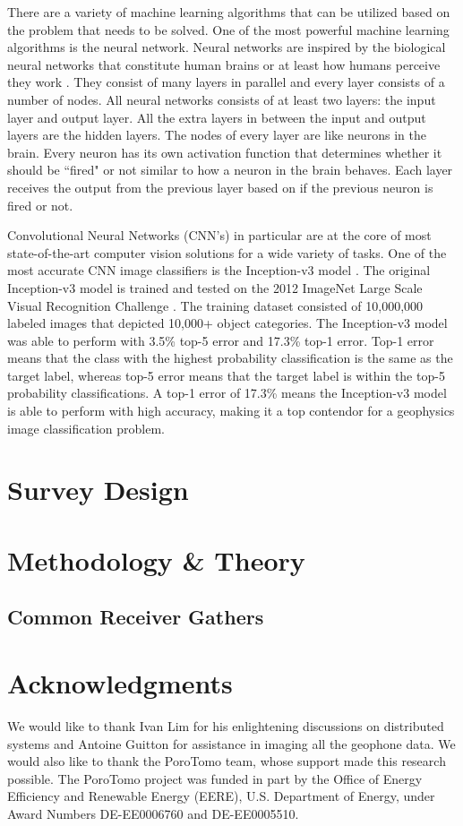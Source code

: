 There are a variety of machine learning algorithms that can be utilized based on the problem that needs to be solved. One of the most powerful machine learning algorithms is the neural network. Neural networks are inspired by the biological neural networks that constitute human brains or at least how humans perceive they work \citep{Gerven2018}. They consist of many layers in parallel and every layer consists of a number of nodes. All neural networks consists of at least two layers: the input layer and output layer. All the extra layers in between the input and output layers are the hidden layers. The nodes of every layer are like neurons in the brain. Every neuron has its own activation function that determines whether it should be ``fired" or not similar to how a neuron in the brain behaves. Each layer receives the output from the previous layer based on if the previous neuron is fired or not.

Convolutional Neural Networks (CNN's) in particular are at the core of most state-of-the-art computer vision solutions for a wide variety of tasks. One of the most accurate CNN image classifiers is the Inception-v3 model \citep{Szegedy2015}. The original Inception-v3 model is trained and tested on the 2012 ImageNet Large Scale Visual Recognition Challenge \citep{ILSVRC15}. The training dataset consisted of 10,000,000 labeled images that depicted 10,000+ object categories. The Inception-v3 model was able to perform with 3.5\% top-5 error and 17.3\% top-1 error. Top-1 error means that the class with the highest probability classification is the same as the target label, whereas top-5 error means that the target label is within the top-5 probability classifications. A top-1 error of 17.3\% means the Inception-v3 model is able to perform with high accuracy, making it a top contendor for a geophysics image classification problem.

\section{Survey Design}

\section{Methodology \& Theory}
\subsection{Common Receiver Gathers}



\section{Acknowledgments}
We would like to thank Ivan Lim for his enlightening discussions on distributed systems and Antoine Guitton for assistance in  imaging all the geophone data. We would also like to thank the PoroTomo team, whose support made this research possible. The PoroTomo project was funded in part by the Office of Energy Efficiency and Renewable Energy (EERE), U.S. Department of Energy, under Award Numbers DE-EE0006760 and  DE-EE0005510.



